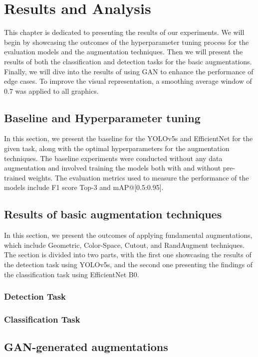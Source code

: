 \chapter{Results and Analysis}\label{results}
This chapter is dedicated to presenting the results of our experiments. We will begin by showcasing the outcomes of the hyperparameter tuning process for the evaluation models and the augmentation techniques. Then we will present the results of both the classification and detection tasks for the basic augmentations. Finally, we will dive into the results of using GAN to enhance the performance of edge cases. To improve the visual representation, a smoothing average window of 0.7 was applied to all graphics.

\section{Baseline and Hyperparameter tuning}
In this section, we present the baseline for the YOLOv5s and EfficientNet for the given task, along with the optimal hyperparameters for the augmentation techniques. The baseline experiments were conducted without any data augmentation and involved training the models both with and without pre-trained weights. The evaluation metrics used to measure the performance of the models include F1 score Top-3 and mAP@[0.5:0.95].


\section{Results of basic augmentation techniques}
In this section, we present the outcomes of applying fundamental augmentations, which include Geometric, Color-Space, Cutout, and RandAugment techniques. The section is divided into two parts, with the first one showcasing the results of the detection task using YOLOv5s, and the second one presenting the findings of the classification task using EfficientNet B0.
\subsection{Detection Task}

\subsection{Classification Task}

\section{GAN-generated augmentations}

